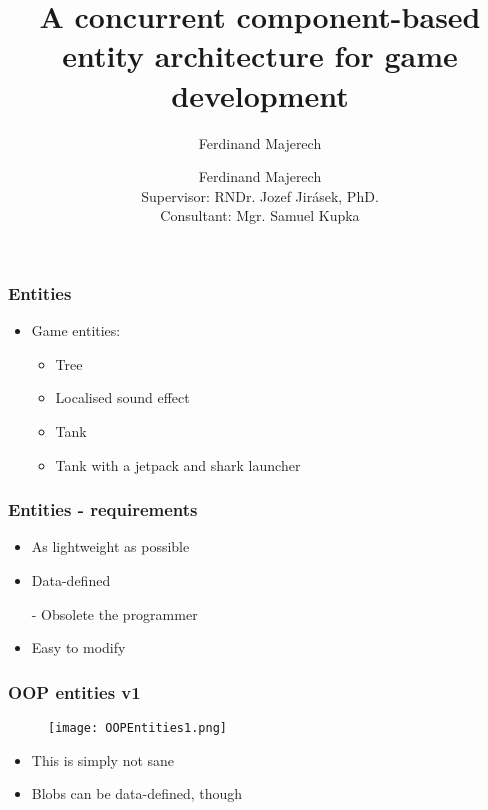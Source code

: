 \documentclass[ignorenonframetext,]{beamer}
\title{A concurrent component-based entity architecture for game development}
\author{Ferdinand Majerech}
\author[Ferdinand Majerech]{Ferdinand Majerech\\{\small Supervisor: RNDr. Jozef Jirásek, PhD. \\Consultant: Mgr. Samuel Kupka}}
\institute[UPJŠ]{Univerzita Pavla Jozefa Šafárika v Košiciach\\UPJŠ}
\begin{document}
\begin{frame}[plain] 
  \titlepage
\end{frame}


\begin{frame}\frametitle{Entities}

\begin{itemize}
\item
  Game entities:

  \begin{itemize}
  \item
    Tree
  \item
    Localised sound effect
  \item
    Tank
  \item
    Tank with a jetpack and shark launcher
  \end{itemize}
\end{itemize}

\end{frame}

\begin{frame}\frametitle{Entities - requirements}

\begin{itemize}
\item
  As lightweight as possible
\item
  Data-defined

  - Obsolete the programmer
\item
  Easy to modify
\end{itemize}

\end{frame}

\begin{frame}\frametitle{OOP entities v1}

\begin{figure}[h!]
\centerline{\texttt{[image: OOPEntities1.png]}}
\end{figure}

\begin{itemize}
\item
  This is simply not sane
\item
  Blobs can be data-defined, though
\end{itemize}

\end{frame}
\end{document}

